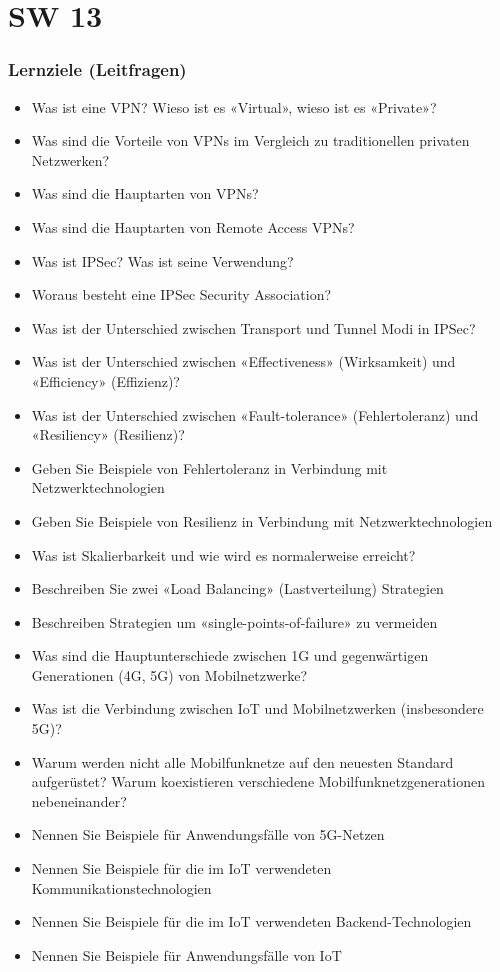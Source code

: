 \part{SW 13}
\section{Lernziele (Leitfragen)}
\begin{itemize}
    \item Was ist eine VPN? Wieso ist es «Virtual», wieso ist es «Private»?
    \item Was sind die Vorteile von VPNs im Vergleich zu traditionellen privaten Netzwerken?
    \item Was sind die Hauptarten von VPNs?
    \item Was sind die Hauptarten von Remote Access VPNs?
    \item Was ist IPSec? Was ist seine Verwendung?
    \item Woraus besteht eine IPSec Security Association?
    \item Was ist der Unterschied zwischen Transport und Tunnel Modi in IPSec?
    \item Was ist der Unterschied zwischen «Effectiveness» (Wirksamkeit) und «Efficiency» (Effizienz)?
    \item Was ist der Unterschied zwischen «Fault-tolerance» (Fehlertoleranz) und «Resiliency» (Resilienz)?
    \item Geben Sie Beispiele von Fehlertoleranz in Verbindung mit Netzwerktechnologien
    \item Geben Sie Beispiele von Resilienz in Verbindung mit Netzwerktechnologien
    \item Was ist Skalierbarkeit und wie wird es normalerweise erreicht?
    \item Beschreiben Sie zwei «Load Balancing» (Lastverteilung) Strategien
    \item Beschreiben Strategien um «single-points-of-failure» zu vermeiden
    \item Was sind die Hauptunterschiede zwischen 1G und gegenwärtigen Generationen (4G, 5G) von Mobilnetzwerke?
    \item Was ist die Verbindung zwischen IoT und Mobilnetzwerken (insbesondere 5G)?
    \item Warum werden nicht alle Mobilfunknetze auf den neuesten Standard aufgerüstet? Warum koexistieren verschiedene Mobilfunknetzgenerationen nebeneinander?
    \item Nennen Sie Beispiele für Anwendungsfälle von 5G-Netzen
    \item Nennen Sie Beispiele für die im IoT verwendeten Kommunikationstechnologien
    \item Nennen Sie Beispiele für die im IoT verwendeten Backend-Technologien
    \item Nennen Sie Beispiele für Anwendungsfälle von IoT
\end{itemize}

